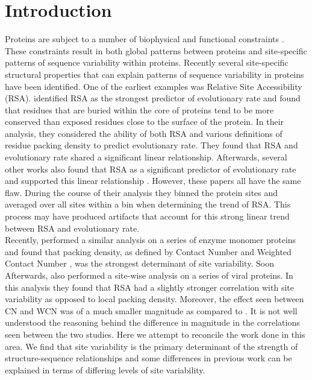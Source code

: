 \documentclass[12pt]{article}
\begin{document}
\section{Introduction}
\label{sec:intro}


Proteins are subject to a number of biophysical and functional constraints \citep{Scherreretal2012, Wilkeetal2010, Sikoseketal2014, Liberlesetal2009, Huangetal2014, Fraseretal2002, Liaoetal2010, Serohijosetal2012}. These constraints result in both global patterns between proteins and site-specific patterns of sequence variability within proteins. Recently several site-specific structural properties that can explain patterns of sequence variability in proteins have been identified. One of the earliest examples was Relative Site Accessibility (RSA). \cite{Fransozaetal2009} identified RSA as the strongest predictor of evolutionary rate and found that residues that are buried within the core of proteins tend to be more conserved than exposed residues close to the surface of the protein. In their analysis, they considered the ability of both RSA and various definitions of residue packing density to predict evolutionary rate. They found that RSA and evolutionary rate shared a significant linear relationship. Afterwards, several other works  also found that RSA as a significant predictor of evolutionary rate and supported this linear relationship \citep{Ramseyetal2011, Scherreretal2012}. However, these papers all have the same flaw. During the course of their analysis they binned the protein sites and averaged over all sites within a bin when determining the trend of RSA. This process may have produced artifacts that account for this strong linear trend between RSA and evolutionary rate. \\
\indent Recently, \cite{Yehetal2014a} performed a similar analysis on a series of enzyme monomer proteins and found that packing density, as defined by Contact Number and Weighted Contact Number \citep{Liaoetal2005, Yehetal2014a, Huangetal2014}, was the strongest determinant of site variability.  Soon Afterwards, \cite{Shahmoradietal2014} also performed a site-wise analysis on a series of viral proteins. In this analysis they found that RSA had a slightly stronger correlation with site variability as opposed to local packing density.  Moreover, the effect seen between CN and WCN was of a much smaller magnitude as compared to \cite{Yehetal2014a}. It is not well understood the reasoning behind the difference in magnitude in the correlations seen between the two studies. Here we attempt to reconcile the work done in this area. We find that site variability is the primary determinant of the strength of structure-sequence relationships and some differences in previous work can be explained in terms of differing levels of site variability. \\
\end{document}
